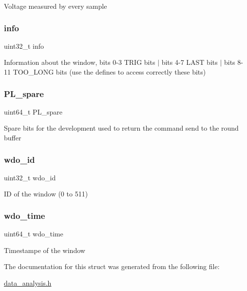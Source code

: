 Voltage measured by every sample \mbox{\label{structdata__axi__st_ab576d88e99031be3391d56e1d8c6b1e7}} 
\subsubsection{\texorpdfstring{info}{info}}
{\footnotesize\ttfamily uint32\+\_\+t info}

Information about the window, bits 0-\/3 T\+R\+IG bits $\vert$ bits 4-\/7 L\+A\+ST bits $\vert$ bits 8-\/11 T\+O\+O\+\_\+\+L\+O\+NG bits (use the defines to access correctly these bits) \mbox{\label{structdata__axi__st_a4f3f069aeefb33818c1360ddeaec0a41}} 
\subsubsection{\texorpdfstring{PL\_spare}{PL\_spare}}
{\footnotesize\ttfamily uint64\+\_\+t P\+L\+\_\+spare}

Spare bits for the development used to return the command send to the round buffer \mbox{\label{structdata__axi__st_ae7e8b9ad7f59c14e9f28823e9f34495b}} 
\subsubsection{\texorpdfstring{wdo\_id}{wdo\_id}}
{\footnotesize\ttfamily uint32\+\_\+t wdo\+\_\+id}

ID of the window (0 to 511) \mbox{\label{structdata__axi__st_ad0e9cadeb03763deb31888ada41218ab}} 
\subsubsection{\texorpdfstring{wdo\_time}{wdo\_time}}
{\footnotesize\ttfamily uint64\+\_\+t wdo\+\_\+time}

Timestampe of the window 

The documentation for this struct was generated from the following file\+:\begin{DoxyCompactItemize}
\item 
\mbox{\hyperlink{data__analysis_8h}{data\+\_\+analysis.\+h}}\end{DoxyCompactItemize}
